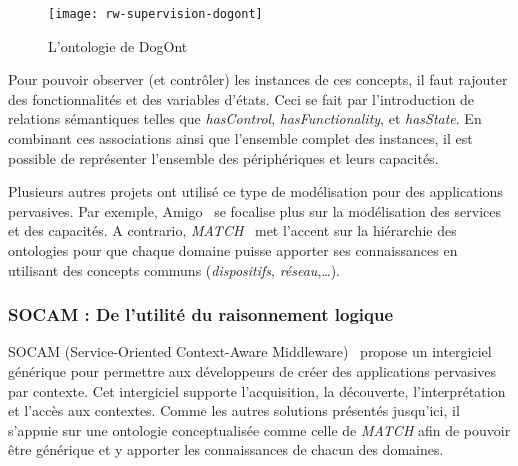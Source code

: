 \begin{figure}[ht]
    \centering
    \texttt{[image: rw-supervision-dogont]}
    \caption{L'ontologie de DogOnt}\label{fig:rw:supervision:dogont}
\end{figure}
Pour pouvoir observer (et contrôler) les instances de ces concepts, il faut rajouter des fonctionnalités et des variables d'états. Ceci se fait par l'introduction de relations sémantiques telles que \textit{hasControl}, \textit{hasFunctionality}, et \textit{hasState}. En combinant ces associations ainsi que l'ensemble complet des instances, il est possible de représenter l'ensemble des périphériques et leurs capacités.

Plusieurs autres projets ont utilisé ce type de modélisation pour des applications pervasives. Par exemple, Amigo~\cite{BenMokhtar:easy} se focalise plus sur la modélisation des services et des capacités. A contrario, \textit{MATCH}~\cite{Docherty:match} met l'accent sur la hiérarchie des ontologies pour que chaque domaine puisse apporter ses connaissances en utilisant des concepts communs (\textit{dispositifs}, \textit{réseau},\dots).

\subsubsection{SOCAM : De l'utilité du raisonnement logique}
SOCAM (Service-Oriented Context-Aware Middleware)~\cite{Gu:socam} propose un intergiciel générique pour permettre aux développeurs de créer des applications pervasives par contexte. Cet intergiciel supporte l'acquisition, la découverte, l'interprétation et l'accès aux contextes. Comme les autres solutions présentés jusqu'ici, il s'appuie sur une ontologie conceptualisée comme celle de \textit{MATCH} afin de pouvoir être générique et y apporter les connaissances de chacun des domaines.

